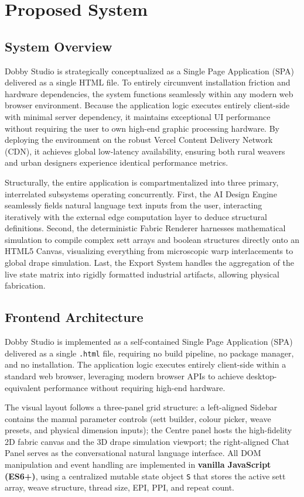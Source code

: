 \chapter{Proposed System}

\section{System Overview}

Dobby Studio is strategically conceptualized as a Single Page Application (SPA) delivered as a single HTML file. To entirely circumvent installation friction and hardware dependencies, the system functions seamlessly within any modern web browser environment. Because the application logic executes entirely client-side with minimal server dependency, it maintains exceptional UI performance without requiring the user to own high-end graphic processing hardware. By deploying the environment on the robust Vercel Content Delivery Network (CDN), it achieves global low-latency availability, ensuring both rural weavers and urban designers experience identical performance metrics.

Structurally, the entire application is compartmentalized into three primary, interrelated subsystems operating concurrently. First, the AI Design Engine seamlessly fields natural language text inputs from the user, interacting iteratively with the external edge computation layer to deduce structural definitions. Second, the deterministic Fabric Renderer harnesses mathematical simulation to compile complex sett arrays and boolean structures directly onto an HTML5 Canvas, visualizing everything from microscopic warp interlacements to global drape simulation. Last, the Export System handles the aggregation of the live state matrix into rigidly formatted industrial artifacts, allowing physical fabrication.

\section{Frontend Architecture}

Dobby Studio is implemented as a self-contained Single Page Application (SPA) delivered as a single \texttt{.html} file, requiring no build pipeline, no package manager, and no installation. The application logic executes entirely client-side within a standard web browser, leveraging modern browser APIs to achieve desktop-equivalent performance without requiring high-end hardware.

The visual layout follows a three-panel grid structure: a left-aligned Sidebar contains the manual parameter controls (sett builder, colour picker, weave presets, and physical dimension inputs); the Centre panel hosts the high-fidelity 2D fabric canvas and the 3D drape simulation viewport; the right-aligned Chat Panel serves as the conversational natural language interface. All DOM manipulation and event handling are implemented in \textbf{vanilla JavaScript (ES6+)}, using a centralized mutable state object \texttt{S} that stores the active sett array, weave structure, thread size, EPI, PPI, and repeat count.


